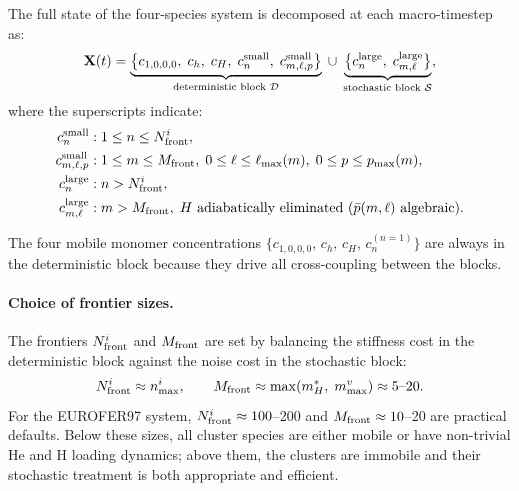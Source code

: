 The full state of the four-species system is decomposed at each
macro-timestep as:
\begin{equation}\label{eq:hybrid_state}
    \mathbf{X}(t)
    = \underbrace{
      \bigl\{
        c_{1,0,0,0},\;
        c_h,\;
        c_H,\;
        c_n^{\rm small},\;
        c_{m,\ell,p}^{\rm small}
      \bigr\}
      }_{\text{deterministic block }\mathcal{D}}
    \;\cup\;
    \underbrace{
      \bigl\{
        c_n^{\rm large},\;
        c_{m,\ell}^{\rm large}
      \bigr\}
      }_{\text{stochastic block }\mathcal{S}},
\end{equation}
where the superscripts indicate:
\begin{align}
    c_n^{\rm small} &: 1 \leq n \leq N_{\rm front}^i, \label{eq:Dsmall}\\
    c_{m,\ell,p}^{\rm small} &: 1 \leq m \leq M_{\rm front},\;
      0 \leq \ell \leq \ell_{\max}(m),\;
      0 \leq p \leq p_{\max}(m), \label{eq:Dsmall_vac}\\
    c_n^{\rm large} &: n > N_{\rm front}^i, \label{eq:Slarge_SIA}\\
    c_{m,\ell}^{\rm large} &: m > M_{\rm front},\;
      H\text{ adiabatically eliminated }(\bar{p}(m,\ell)\text{ algebraic}).
      \label{eq:Slarge_vac}
\end{align}

The four mobile monomer concentrations
$\{c_{1,0,0,0},\,c_h,\,c_H,\,c_n^{(n=1)}\}$ are always in the
deterministic block because they drive all cross-coupling between the
blocks.

\paragraph{Choice of frontier sizes.}
The frontiers $N_{\rm front}^i$ and $M_{\rm front}$ are set by
balancing the stiffness cost in the deterministic block against the
noise cost in the stochastic block:
\begin{equation}\label{eq:frontier_choice}
    N_{\rm front}^i \approx n_{\max}^i,
    \qquad
    M_{\rm front} \approx \max(m_H^*,\;m_{\max}^v) \approx 5\text{--}20.
\end{equation}
For the EUROFER97 system, $N_{\rm front}^i \approx 100$--200 and
$M_{\rm front} \approx 10$--20 are practical defaults.  Below these
sizes, all cluster species are either mobile or have non-trivial He
and H loading dynamics; above them, the clusters are immobile and
their stochastic treatment is both appropriate and efficient.

